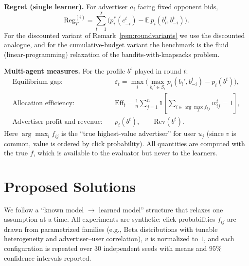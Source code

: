 \documentclass{article}
\theoremstyle{definition}
\theoremstyle{remark}
\newcommand{\E}{\mathbb{E}}
\newcommand{\ind}[1]{\mathds{1}\!\left[#1\right]}\newcommand{\Reg}{\mathrm{Reg}}
\begin{document}
\medskip
\noindent\textbf{Regret (single learner).} For advertiser $a_i$ facing fixed opponent bids,
\[
\Reg^{(i)}_T=\sum_{t=1}^T\Big(p_i^\ast(c^t_{-i})-\E\,p_i(b^t_i,b^t_{-i})\Big).
\]
For the discounted variant of Remark~\ref{rem:roundvariants} we use the discounted analogue, and for the cumulative-budget variant the benchmark is the fluid (linear-programming) relaxation of the bandits-with-knapsacks problem.

\medskip
\noindent\textbf{Multi-agent measures.} For the profile $b^t$ played in round $t$:
\begin{align*}
\text{Equilibrium gap:}\quad & \varepsilon_t=\max_i\Big(\max_{b_i'\in S_i}p_i(b_i',b^t_{-i})-p_i(b^t)\Big),\\
\text{Allocation efficiency:}\quad & \mathrm{Eff}_t=\frac1n\sum_{j=1}^n\ind{\textstyle\sum_{i\in\arg\max_k f_{kj}}w^t_{ij}=1},\\
\text{Advertiser profit and revenue:}\quad & p_i(b^t),\qquad \mathrm{Rev}(b^t).
\end{align*}
Here $\arg\max_i f_{ij}$ is the ``true highest-value advertiser'' for user $u_j$ (since $v$ is common, value is ordered by click probability). All quantities are computed with the true $f$, which is available to the evaluator but never to the learners.

\section{Proposed Solutions}
\label{sec:solutions}

We follow a ``known model $\to$ learned model'' structure that relaxes one assumption at a time. All experiments are synthetic: click probabilities $f_{ij}$ are drawn from parametrized families (e.g., $\mathrm{Beta}$ distributions with tunable heterogeneity and advertiser--user correlation), $v$ is normalized to $1$, and each configuration is repeated over $30$ independent seeds with means and $95\%$ confidence intervals reported.
\end{document}
